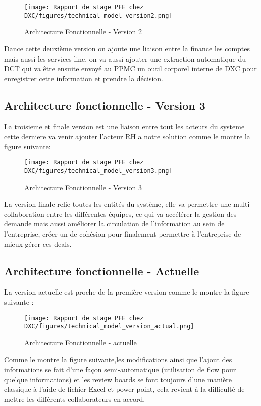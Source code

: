 \begin{figure}[!h]
    \centering
    \texttt{[image: Rapport de stage PFE chez DXC/figures/technical\_model\_version2.png]}
    \caption{Architecture Fonctionnelle - Version 2}
\end{figure}

Dance cette deuxième version on ajoute une liaison entre la finance les comptes mais aussi les services line, on va aussi ajouter une extraction automatique du DCT qui va être ensuite envoyé au PPMC un outil corporel interne de DXC pour enregistrer cette information et prendre la décision.

\newpage
\subsection{Architecture fonctionnelle - Version 3}
La troisieme et finale version est une liaison entre tout les acteurs du systeme cette derniere va venir ajouter l'acteur RH a notre solution comme le montre la figure suivante:

\begin{figure}[!h]
    \centering
    \texttt{[image: Rapport de stage PFE chez DXC/figures/technical\_model\_version3.png]}
    \caption{Architecture Fonctionnelle - Version 3}
\end{figure}

La version finale relie toutes les entités du système, elle va permettre une multi-collaboration entre les différentes équipes, ce qui va accélérer la gestion des demande mais aussi améliorer la circulation de l'information au sein de l'entreprise, créer un de cohésion pour finalement permettre à l'entreprise de mieux gérer ces deals.

\newpage
\subsection{Architecture fonctionnelle - Actuelle}

La version actuelle est proche de la première version comme le montre la figure suivante :

\begin{figure}[!h]
    \centering
    \texttt{[image: Rapport de stage PFE chez DXC/figures/technical\_model\_version\_actual.png]}
    \caption{Architecture Fonctionnelle - actuelle}
\end{figure}

Comme le montre la figure suivante,les modifications ainsi que l'ajout des informations se fait d'une façon semi-automatique (utilisation de flow pour quelque informations) et les review boards se font toujours d'une manière classique à l'aide de fichier Excel et power point, cela revient à la difficulté de mettre les différents collaborateurs en accord.

